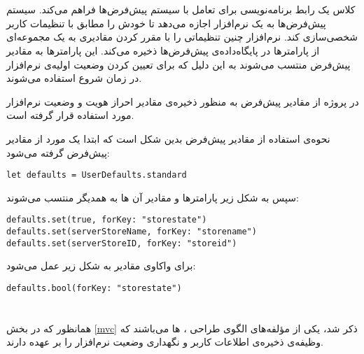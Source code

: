 \documentclass[oneside]{report}
\begin{document}
\section{ {\normalsize {}}}	
کلاس
	{\normalsize {}}
	یک رابط برنامه‌نویسی برای تعامل با سیستم پیش‌فرض‌ها 
	فراهم می‌کند. سیستم پیش‌فرض‌ها به یک نرم‌افزار اجازه می‌دهد تا خودش را مطابق با تنظیمات کاربر شخصی‌سازی کند. نرم‌افزار چنین تنظیماتی را با مقرر کردن مقادیری به یک مجموعه‌ای از پارامترها در پایگاه‌داده‌ی پیش‌فرض‌ها ذخیره می‌کند. این پارامتر‌ها به مقادیر پیش‌فرض منتسب می‌شوند به این دلیل که برای تعیین کردن وضعیت اولیه‌ی نرم‌افزار در زمان شروع استفاده می‌شوند. 
	
در پروژه از مقادیر پیش‌فرض به منظور ذخیره‌ی مقادیر احراز هویت و وضعیت نرم‌افزار مورد استفاده قرار گرفته است. 

نحوه‌ی استفاده از مقادیر پیش‌فرض بدین شکل است که ابتدا یک مورد از مقادیر پیش‌فرض گرفته می‌شود:
\begin{latin}
	\begin{verbatim}
let defaults = UserDefaults.standard	
	\end{verbatim}
	
\end{latin}	
	سپس به شکل زیر پارامترها و مقادیر آن ها به همدیگر منتسب می‌شوند:
\begin{latin}
	\begin{verbatim}
defaults.set(true, forKey: "storestate")
defaults.set(serverStoreName, forKey: "storename")
defaults.set(serverStoreID, forKey: "storeid")
	\end{verbatim}
	
\end{latin}		
	برای واکاوی مقادیر به شکل زیر عمل می‌شود: 
	\begin{latin}
		\begin{verbatim}
defaults.bool(forKey: "storestate") 
		\end{verbatim}
		
	\end{latin}	
	
\section{{\normalsize {}}}
	همانظور که در بخش 
	\ref{mvc}
	ذکر شد، یکی از مؤلفه‌های الگوی طراحی 
	{\normalsize {}}،
	{\normalsize {}}ها 
	می‌باشند که وظیفه‌ی ذخیره‌ی اطلاعات کاربر و نگهداری وضعیت نرم‌افزار را بر عهده دارند. 
\end{document}
